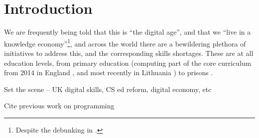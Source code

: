 \documentclass[sigconf]{acmart}
\begin{document}

\maketitle


\section{Introduction}
We are frequently being told that this is ``the digital age'', and that we ``live in a knowledge economy''\footnote{Despite the debunking in \cite{Friesen2008}.}, and across the world there are a bewildering plethora of initiatives to address this, and the corresponding skills shortages. These are at all education levels, from primary education (computing part of the core curriculum from 2014 in England \cite{brown-et-al:sigcse2013,DfE2013a}, and most recently in Lithuania \cite{Xinhua2018a}) to prisons \cite{Maher2018a}.

Set the scene -- UK digital skills, CS ed reform, digital economy, etc

Cite previous work on
programming~\cite{davenport-et-al:latice2016,murphy-et-al:programming2017,simon-et-al:sigcse2018}
\end{document}

